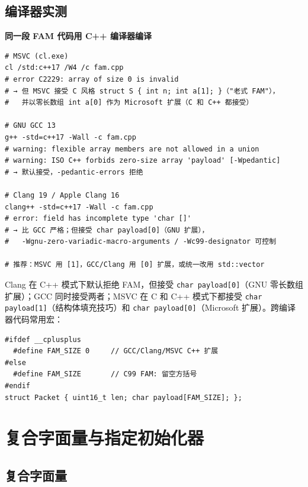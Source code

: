 \documentclass[12pt,a4paper,fontset=fandol]{ctexbook}
\newcommand{\cpplabel}{%
  \tcbox[on line,colback=cppheadbg,colframe=cppheadbg,
    boxrule=0pt,arc=1pt,left=2pt,right=2pt,top=1pt,bottom=1pt,
    colupper=white,fontupper=\scriptsize\bfseries]{C++}}
\newcommand{\shelllabel}{%
  \tcbox[on line,colback=bashheadbg,colframe=bashheadbg,
    boxrule=0pt,arc=1pt,left=2pt,right=2pt,top=1pt,bottom=1pt,
    colupper=white,fontupper=\scriptsize\bfseries]{Shell}}
\newcommand{\cpp}[1]{C++#1}
\newcommand{\kw}[1]{\texttt{#1}}
\begin{document}
\section{编译器实测}

\begin{compilerbox}
\textbf{同一段 FAM 代码用 \cpp{} 编译器编译}
\end{compilerbox}

\shelllabel{}
\begin{lstlisting}[style=bashstyle]
# MSVC (cl.exe)
cl /std:c++17 /W4 /c fam.cpp
# error C2229: array of size 0 is invalid
# → 但 MSVC 接受 C 风格 struct S { int n; int a[1]; }（"老式 FAM"），
#   并以零长数组 int a[0] 作为 Microsoft 扩展（C 和 C++ 都接受）

# GNU GCC 13
g++ -std=c++17 -Wall -c fam.cpp
# warning: flexible array members are not allowed in a union
# warning: ISO C++ forbids zero-size array 'payload' [-Wpedantic]
# → 默认接受，-pedantic-errors 拒绝

# Clang 19 / Apple Clang 16
clang++ -std=c++17 -Wall -c fam.cpp
# error: field has incomplete type 'char []'
# → 比 GCC 严格；但接受 char payload[0]（GNU 扩展），
#   -Wgnu-zero-variadic-macro-arguments / -Wc99-designator 可控制

# 推荐：MSVC 用 [1]，GCC/Clang 用 [0] 扩展，或统一改用 std::vector
\end{lstlisting}

\begin{note}
Clang 在 \cpp{} 模式下默认拒绝 FAM，但接受 \kw{char payload[0]}（GNU 零长数组扩展）；GCC 同时接受两者；MSVC 在 C 和 \cpp{} 模式下都接受 \kw{char payload[1]}（结构体填充技巧）和 \kw{char payload[0]}（Microsoft 扩展）。跨编译器代码常用宏：

\cpplabel{}
\begin{lstlisting}
#ifdef __cplusplus
  #define FAM_SIZE 0     // GCC/Clang/MSVC C++ 扩展
#else
  #define FAM_SIZE       // C99 FAM: 留空方括号
#endif
struct Packet { uint16_t len; char payload[FAM_SIZE]; };
\end{lstlisting}
\end{note}


\chapter{复合字面量与指定初始化器}

\section{复合字面量}
\end{document}
